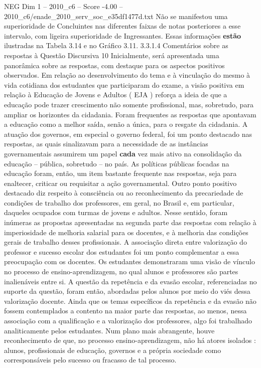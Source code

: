 \begin{textsample}{NEG Dim 1 – 2010\_c6 – Score -4.00 – 2010\_c6/enade\_2010\_serv\_soc\_e35df1477d.txt}
Não se manifestou uma superioridade de Concluintes nas diferentes faixas de notas posteriores a esse intervalo, com ligeira superioridade de Ingressantes.
Essas informações \textbf{estão} ilustradas na Tabela 3.14 e no Gráfico 3.11. 3.3.1.4 Comentários sobre as respostas à Questão Discursiva 10 Inicialmente, será apresentada uma panorâmica sobre as respostas, com destaque para os aspectos positivos observados.
Em relação ao desenvolvimento do tema e à vinculação do mesmo à vida cotidiana dos estudantes que participaram do exame, a visão positiva em relação à Educação de Jovens e Adultos ( EJA ) reforça a ideia de que a educação pode trazer crescimento não somente profissional, mas, sobretudo, para ampliar os horizontes da cidadania.
Foram frequentes as respostas que apontavam a educação como a melhor saída, senão a única, para o resgate da cidadania.
A atuação dos governos, em especial o governo federal, foi um ponto destacado nas respostas, as quais sinalizavam para a necessidade de as instâncias governamentais assumirem um papel \textbf{cada} vez mais ativo na consolidação da educação – pública, sobretudo – no país.
As políticas públicas focadas na educação foram, então, um item bastante frequente nas respostas, seja para enaltecer, criticar ou requisitar a ação governamental.
Outro ponto positivo destacado diz respeito à consciência ou ao reconhecimento da precariedade de condições de trabalho dos professores, em geral, no Brasil e, em particular, daqueles ocupados com turmas de jovens e adultos.
Nesse sentido, foram inúmeras as propostas apresentadas na segunda parte das respostas com relação à imperiosidade de melhoria salarial para os docentes, e à melhoria das condições gerais de trabalho desses profissionais.
A associação direta entre valorização do professor e sucesso escolar dos estudantes foi um ponto complementar a essa preocupação com os docentes.
Os estudantes demonstraram uma visão de vínculo no processo de ensino-aprendizagem, no qual alunos e professores são partes inalienáveis entre si.
A questão da repetência e da evasão escolar, referenciadas no suporte da questão, foram então, abordadas pelos alunos por meio do viés dessa valorização docente.
Ainda que os temas específicos da repetência e da evasão não fossem contemplados a contento na maior parte das respostas, ao menos, nessa associação com a qualificação e a valorização dos professores, algo foi trabalhado analiticamente pelos estudantes.
Num plano mais abrangente, houve reconhecimento de que, no processo ensino-aprendizagem, não há atores isolados : alunos, profissionais de educação, governos e a própria sociedade como corresponsáveis pelo sucesso ou fracasso de tal processo.

\end{textsample}
